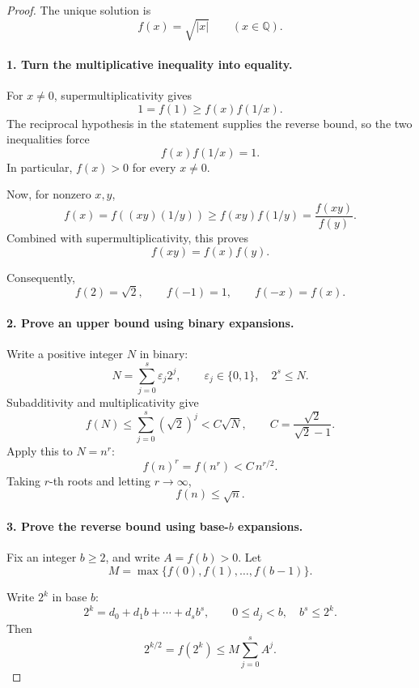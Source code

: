 
\begin{dlsummary}[title={\bfseries Solution 62. The Hidden Square Root},breakable]

\begin{proof}
The unique solution is
\[
\boxed{f(x)=\sqrt{|x|}\qquad(x\in\mathbb Q).}
\]

\paragraph{1. Turn the multiplicative inequality into equality.}

For \(x\ne0\), supermultiplicativity gives
\[
1=f(1)\ge f(x)f(1/x).
\]
The reciprocal hypothesis in the statement supplies the reverse bound, so
the two inequalities force
\[
f(x)f(1/x)=1.
\]
In particular, \(f(x)>0\) for every \(x\ne0\).

Now, for nonzero \(x,y\),
\[
f(x)=f((xy)(1/y))
\ge f(xy)f(1/y)=\frac{f(xy)}{f(y)}.
\]
Combined with supermultiplicativity, this proves
\[
\boxed{f(xy)=f(x)f(y).} \tag{4}
\]

Consequently,
\[
f(2)=\sqrt2,\qquad f(-1)=1,\qquad f(-x)=f(x).
\]

\paragraph{2. Prove an upper bound using binary expansions.}

Write a positive integer \(N\) in binary:
\[
N=\sum_{j=0}^{s}\varepsilon_j2^j,
\qquad \varepsilon_j\in\{0,1\},\quad 2^s\le N.
\]
Subadditivity and multiplicativity give
\[
f(N)\le\sum_{j=0}^{s}(\sqrt2)^j
< C\sqrt N,
\qquad
C=\frac{\sqrt2}{\sqrt2-1}.
\]
Apply this to \(N=n^r\):
\[
f(n)^r=f(n^r)<C\,n^{r/2}.
\]
Taking \(r\)-th roots and letting \(r\to\infty\),
\[
\boxed{f(n)\le\sqrt n.} \tag{5}
\]

\paragraph{3. Prove the reverse bound using base-\(b\) expansions.}

Fix an integer \(b\ge2\), and write \(A=f(b)>0\). Let
\[
M=\max\{f(0),f(1),\ldots,f(b-1)\}.
\]

Write \(2^k\) in base \(b\):
\[
2^k=d_0+d_1b+\cdots+d_sb^s,
\qquad 0\le d_j<b,\quad b^s\le2^k.
\]
Then
\[
2^{k/2}=f(2^k)\le M\sum_{j=0}^{s}A^j. \tag{6}
\]


\end{proof}
\end{dlsummary}
